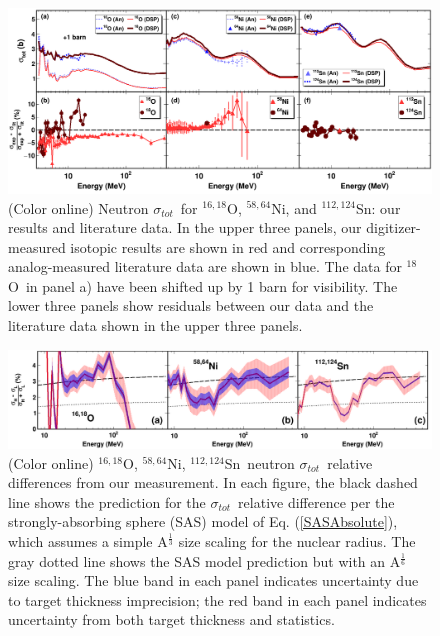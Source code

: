 \documentclass[twocolumn,secnumarabic,amssymb, nobibnotes, aps, prl,
superscriptaddress, nobalancelastpage, draft]{revtex4}
\newcommand{\tot}{\ensuremath{\sigma_{tot}}}
\newcommand{\oEight}{\ensuremath{^{18}}O}
\newcommand{\oSixEight}{\ensuremath{^{16,18}}O}
\newcommand{\niEightFour}{\ensuremath{^{58,64}}N\lowercase{i}}
\newcommand{\snTwelveFour}{\ensuremath{^{112,124}}S\lowercase{n}}
\begin{document}
\begin{figure}[tb]
    \centering
    \includegraphics[width=\textwidth]{figures/SixPanel.png}
    \caption[Neutron \tot\ for \oSixEight, \niEightFour, and \snTwelveFour: our results and literature data]
    {(Color online) Neutron \tot\ for \oSixEight, \niEightFour, and \snTwelveFour: our results 
        and literature data.  In the upper three panels, our digitizer-measured
        isotopic results are shown in red and
        corresponding analog-measured literature data \cite{Finlay1993, 
        Perey1972, Vaughn1965, Salisbury1965, Perey1993, Dukarevich1967,
        Harper1982, Timokhov1989, Rapaport1980} are shown in blue.
        The data for \oEight\ in panel a) have been
        shifted up by 1 barn for visibility.
        The lower three panels show residuals between our data and the
        literature data shown in the upper three panels.
    }
    \label{SixPanel}
\end{figure}
\begin{figure}[tb]
    \centering
    \includegraphics[width=\textwidth]{figures/ThreePanelRelDiff.png}
    \caption[\oSixEight, \niEightFour, \snTwelveFour\ neutron \tot\ relative difference]
    {
        (Color online) \oSixEight, \niEightFour, \snTwelveFour\ neutron \tot\ relative differences
        from our measurement. In each figure, the black dashed line shows the 
        prediction for the \tot\ relative difference per the strongly-absorbing 
        sphere (SAS) model of Eq. (\ref{SASAbsolute}), which assumes a simple 
        A$^{\frac{1}{3}}$ size scaling for the nuclear radius.
        The gray dotted line shows the
        SAS model prediction but with an
        A$^{\frac{1}{6}}$ size scaling. The blue band in each panel indicates
        uncertainty due to target thickness imprecision;
        the red band in each panel
        indicates uncertainty from both target thickness and statistics.
    }
    \label{ThreePanelRelDiff}
\end{figure}
\end{document}

